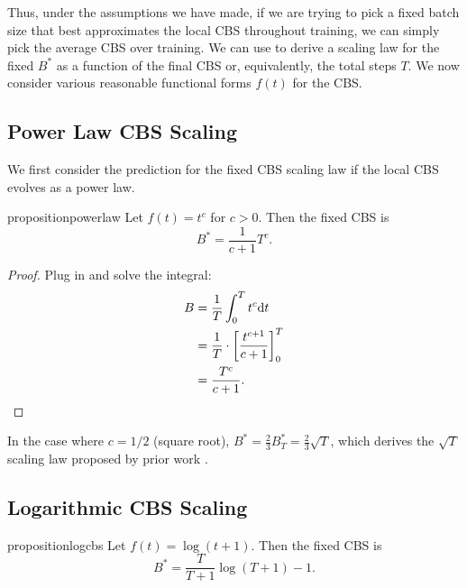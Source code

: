 Thus, under the assumptions we have made, if we are trying to pick a fixed batch size that best approximates the local CBS throughout training, we can simply pick the average CBS over training.
We can use  to derive a scaling law for the fixed $B^*$ as a function of the final CBS or, equivalently, the total steps $T$.
We now consider various reasonable functional forms $f(t)$ for the CBS.

\subsection{Power Law CBS Scaling}

We first consider the prediction for the fixed CBS scaling law if the local CBS evolves as a power law.

\begin{restatable}{proposition}{powerlaw}
    Let $f(t) = t^c$ for $c > 0$. Then the fixed CBS is
    \begin{equation*}
        B^* = \frac{1}{c+1} T^c .
    \end{equation*}
\end{restatable}

\begin{proof}
    Plug in and solve the integral:
    \begin{align*}
        B
        &= \frac{1}{T} \int_0^T t^c \mathrm{d}t \\
        &= \frac{1}{T} \cdot \bigg[\frac{t^{c+1}}{c+1} \bigg]^T_0 \\
        &= \frac{T^c}{c+1} . \qedhere
    \end{align*}
\end{proof}

In the case where $c=1/2$ (square root), $B^* = \frac{2}{3} B^*_T = \frac{2}{3} \sqrt{T}$, which derives the $\sqrt{T}$ scaling law proposed by prior work \citep{zhang2024cbs}.

\subsection{Logarithmic CBS Scaling}

\begin{restatable}{proposition}{logcbs}
    Let $f(t) = \log (t + 1)$. Then the fixed CBS is
    \begin{equation*}
        B^* = \frac{T}{T+1} \log (T + 1) - 1 .
    \end{equation*}
\end{restatable}

